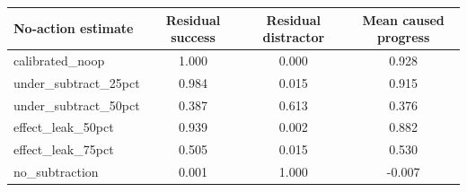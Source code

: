 \begin{tabular}{lccc}
\toprule
No-action estimate & Residual success & Residual distractor & Mean caused progress \\
\midrule
calibrated\_noop & 1.000 & 0.000 & 0.928 \\
under\_subtract\_25pct & 0.984 & 0.015 & 0.915 \\
under\_subtract\_50pct & 0.387 & 0.613 & 0.376 \\
effect\_leak\_50pct & 0.939 & 0.002 & 0.882 \\
effect\_leak\_75pct & 0.505 & 0.015 & 0.530 \\
no\_subtraction & 0.001 & 1.000 & -0.007 \\
\bottomrule
\end{tabular}
